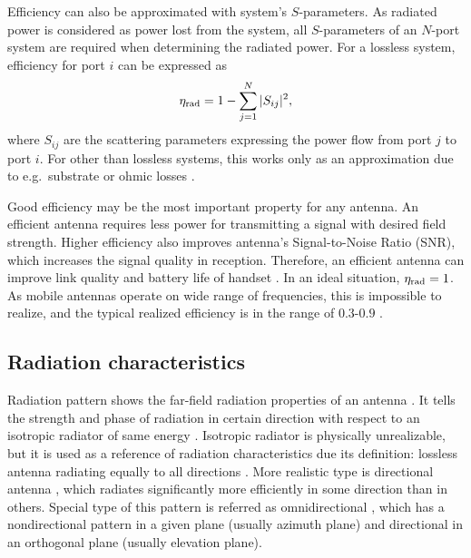 Efficiency can also be approximated with system's $S$-parameters. As radiated power is considered as power lost from the system, all $S$-parameters of an $N$-port system are required when determining the radiated power. For a lossless system, efficiency for port $i$ \cite{lehtovuori_phd} can be expressed as
\begin{equation}
\label{eq:eff_aprx}
    {\eta}_{\mathrm{rad}} = 1-\sum_{j=1}^{N}|S_{ij}|^2,
\end{equation}
where $S_{ij}$ are the scattering parameters expressing the power flow from port $j$ to port $i$. For other than lossless systems, this works only as an approximation due to e.g.\ substrate or ohmic losses \cite{lehtovuori_phd}.

Good efficiency may be the most important property for any antenna. An efficient antenna requires less power for transmitting a signal with desired field strength. Higher efficiency also improves antenna's Signal-to-Noise Ratio (SNR), which increases the signal quality in reception. Therefore, an efficient antenna can improve link quality and battery life of handset \cite{molisch}. In an ideal situation, ${\eta}_{\mathrm{rad}}=1$. As mobile antennas operate on wide range of frequencies, this is impossible to realize, and the typical realized efficiency is in the range of $0.3$-$0.9$ \cite{volakis,ilvonen_phd}. %


\subsection{Radiation characteristics}
\label{sec:pattern}
Radiation pattern shows the far-field radiation properties of an antenna \cite{balanis, stutzman}. It tells the strength and phase of radiation in certain direction with respect to an isotropic radiator of same energy \cite{balanis}. Isotropic radiator is physically unrealizable, but it is used as a reference of radiation characteristics due its definition: lossless antenna radiating equally to all directions \cite{balanis}. More realistic type is directional antenna \cite{balanis}, which radiates significantly more efficiently in some direction than in others. Special type of this pattern is referred as omnidirectional \cite{balanis}, which has a nondirectional pattern in a given plane (usually azimuth plane) and directional in an orthogonal plane (usually elevation plane).

